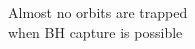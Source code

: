 \documentclass[preview]{standalone}
\begin{document}
Almost no orbits are trapped\\ when BH capture is possible\\
\end{document}
